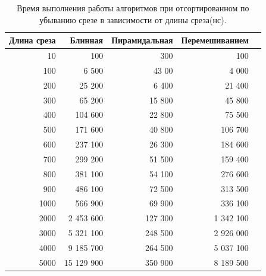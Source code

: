 \begin{table}[!ht]
    \centering
    \caption{\label{tab:tableDesc} Время выполнения работы алгоритмов при отсортированном по убыванию срезе
    в зависимости от длины среза(нс).}
    \begin{tabular}{|r|r|r|r|r|}
    \hline
        Длина среза & Блинная & Пирамидальная & Перемешиванием   \\ \hline
        10 & 100 & 300 & 100   \\ \hline
        100 & 6 500 & 43 00 & 4 000   \\ \hline
        200 & 25 200 & 6 400 & 21 400   \\ \hline
        300 & 65 200 & 15 800 & 45 800   \\ \hline
        400 & 104 600 & 22 800 & 75 500   \\ \hline
        500 & 171 600 & 40 800 & 106 700   \\ \hline
        600 & 237 100 & 26 300 & 184 600   \\ \hline
        700 & 299 200 & 51 500 & 159 400   \\ \hline
        800 & 381 100 & 54 100 & 276 600   \\ \hline
        900 & 486 100 & 72 500 & 313 500   \\ \hline
        1000 & 566 900 & 69 900 & 336 100   \\ \hline
        2000 & 2 453 600 & 127 300 & 1 342 100   \\ \hline
        3000 & 5 321 100 & 248 500 & 2 926 000   \\ \hline
        4000 & 9 185 700 & 264 500 & 5 037 100   \\ \hline
        5000 & 15 129 900 & 350 900 & 8 189 500  \\ \hline
    \end{tabular}
\end{table}


